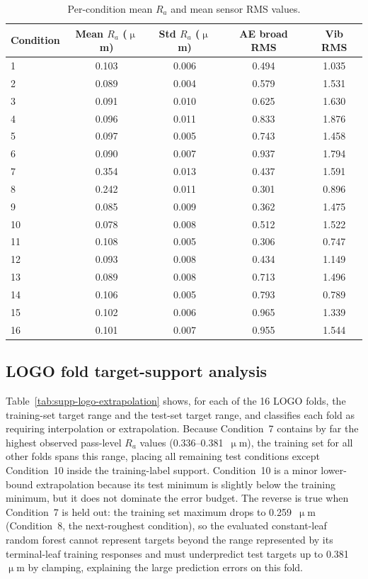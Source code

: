 \begin{table}[htbp]
\centering
\caption{Per-condition mean $R_a$ and mean sensor RMS values.}
\label{tab:supp-condition-diagnostics}
\begin{tabular}{@{}lcccc@{}}
\toprule
Condition & Mean $R_a$ (\(\upmu\)m) & Std $R_a$ (\(\upmu\)m) & AE broad RMS & Vib RMS \\
\midrule
1 & 0.103 & 0.006 & 0.494 & 1.035 \\
2 & 0.089 & 0.004 & 0.579 & 1.531 \\
3 & 0.091 & 0.010 & 0.625 & 1.630 \\
4 & 0.096 & 0.011 & 0.833 & 1.876 \\
5 & 0.097 & 0.005 & 0.743 & 1.458 \\
6 & 0.090 & 0.007 & 0.937 & 1.794 \\
7 & 0.354 & 0.013 & 0.437 & 1.591 \\
8 & 0.242 & 0.011 & 0.301 & 0.896 \\
9 & 0.085 & 0.009 & 0.362 & 1.475 \\
10 & 0.078 & 0.008 & 0.512 & 1.522 \\
11 & 0.108 & 0.005 & 0.306 & 0.747 \\
12 & 0.093 & 0.008 & 0.434 & 1.149 \\
13 & 0.089 & 0.008 & 0.713 & 1.496 \\
14 & 0.106 & 0.005 & 0.793 & 0.789 \\
15 & 0.102 & 0.006 & 0.965 & 1.339 \\
16 & 0.101 & 0.007 & 0.955 & 1.544 \\
\bottomrule
\end{tabular}
\end{table}

\subsection*{LOGO fold target-support analysis}

Table~\ref{tab:supp-logo-extrapolation} shows, for each of the 16 LOGO
folds, the training-set target range and the test-set target range, and
classifies each fold as requiring interpolation or extrapolation.
Because Condition~7 contains by far the highest observed pass-level
$R_a$ values (0.336--0.381~\(\upmu\)m), the training set for all other folds
spans this range, placing all remaining test conditions except
Condition~10 inside the training-label support. Condition~10 is a minor
lower-bound extrapolation because its test minimum is slightly below the
training minimum, but it does not dominate the error budget. The reverse
is true when Condition~7 is held out: the training set maximum drops to
0.259~\(\upmu\)m (Condition~8, the next-roughest condition), so
the evaluated constant-leaf random forest cannot represent targets beyond
the range represented by its terminal-leaf training responses and must
underpredict test targets up to
0.381~\(\upmu\)m by clamping, explaining the large prediction
errors on this fold.

